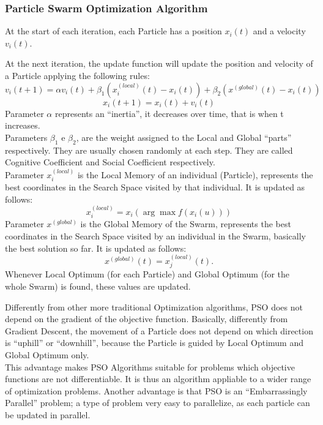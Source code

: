 \subsubsection{Particle Swarm Optimization Algorithm}

At the start of each iteration, each Particle has a position $x_i(t)$ and a velocity $v_i(t)$.

\label{sec:UpdateOfParticles-3.1.1}
At the next iteration, the update function will update the position and velocity of a Particle applying the following rules:
\begin{equation}
	v_i(t+1) = \alpha v_i(t) + \beta_1(x_i^{(local)}(t) - x_i(t)) + \beta_2(x^{(global)}(t) - x_i(t))
\end{equation}
\begin{equation}
	x_i(t+1) = x_i(t) + v_i(t)
\end{equation}
Parameter $\alpha$ represents an “inertia”, it decreases over time, that is when t increases.
\\[0.3cm]Parameters $\beta_1$ e $\beta_2$, are the weight assigned to the Local and Global “parts” respectively. They are usually chosen randomly at each step. They are called Cognitive Coefficient and Social Coefficient respectively.
\\[0.3cm]Parameter  $x_i^{(local)}$  is the Local Memory of an individual (Particle), represents the best coordinates in the Search Space visited by that individual. It is updated as follows:
\begin{equation}
	x_i^{(local)} = x_i(\arg \max f(x_i(u)))
\end{equation}
Parameter $x^{(global)}$ is the Global Memory of the Swarm, represents the best coordinates in the Search Space visited by an individual in the Swarm, basically the best solution so far. It is updated as follows:
\begin{equation}
	x^{(global)}(t) = x_j^{(local)}(t).
\end{equation}
Whenever Local Optimum (for each Particle) and Global Optimum (for the whole Swarm) is found, these values are updated.

Differently from other more traditional Optimization algorithms, PSO does not depend on the gradient of the objective function.
Basically, differently from Gradient Descent, the movement of a Particle does not depend on which direction is “uphill” or “downhill”, because the Particle is guided by Local Optimum and Global Optimum only.
\\[0.3cm]This advantage makes PSO Algorithms suitable for problems which objective functions are not differentiable. It is thus an algorithm appliable to a wider range of optimization problems.
Another advantage is that PSO is an “Embarrassingly Parallel” problem; a type of problem very easy to parallelize, as each particle can be updated in parallel.

